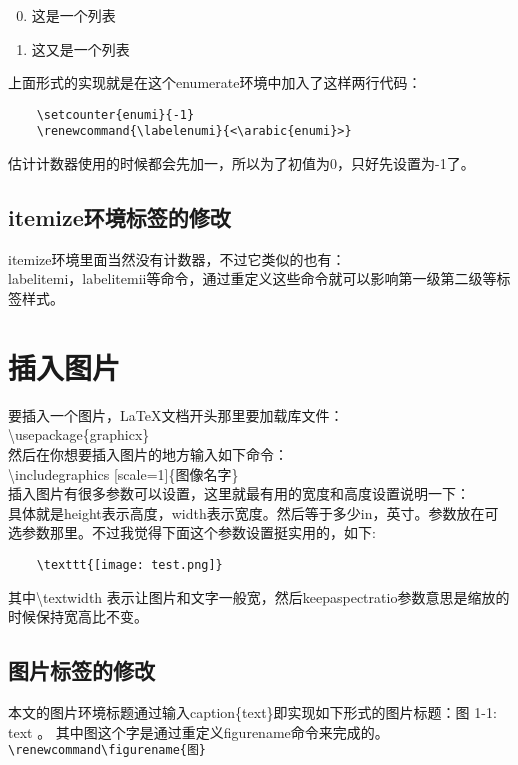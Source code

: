 \documentclass[11pt,oneside]{book}
\begin{document}
  \begin{enumerate}
    \setcounter{enumi}{-1}
    \renewcommand{\labelenumi}{<\arabic{enumi}>}
  \item 这是一个列表
  \item 这又是一个列表
  \end{enumerate}

  上面形式的实现就是在这个enumerate环境中加入了这样两行代码：
  \begin{Verbatim}
    \setcounter{enumi}{-1}
    \renewcommand{\labelenumi}{<\arabic{enumi}>}
  \end{Verbatim}
  估计计数器使用的时候都会先加一，所以为了初值为0，只好先设置为-1了。

  \section{itemize环境标签的修改}
  itemize环境里面当然没有计数器，不过它类似的也有：\\ labelitemi，labelitemii等命令，通过重定义这些命令就可以影响第一级第二级等标签样式。








  \chapter{插入图片}
  要插入一个图片，\LaTeX 文档开头那里要加载库文件：\\
  \textbackslash usepackage\{graphicx\}\\
  然后在你想要插入图片的地方输入如下命令：\\
  \textbackslash includegraphics [scale=1]\{图像名字\}\\
  插入图片有很多参数可以设置，这里就最有用的宽度和高度设置说明一下：\\
  具体就是height表示高度，width表示宽度。然后等于多少in，英寸。参数放在可选参数那里。不过我觉得下面这个参数设置挺实用的，如下:
  \begin{Verbatim}
    \texttt{[image: test.png]}
  \end{Verbatim}
  其中\textbackslash textwidth 表示让图片和文字一般宽，然后keepaspectratio参数意思是缩放的时候保持宽高比不变。

  \section{图片标签的修改}
  \label{sec:图片标签的修改}
  本文的图片环境标题通过输入caption\{text\}即实现如下形式的图片标题：图 1-1: text  。
  其中图这个字是通过重定义figurename命令来完成的。\\
  \verb+\renewcommand\figurename{图}+
\end{document}
